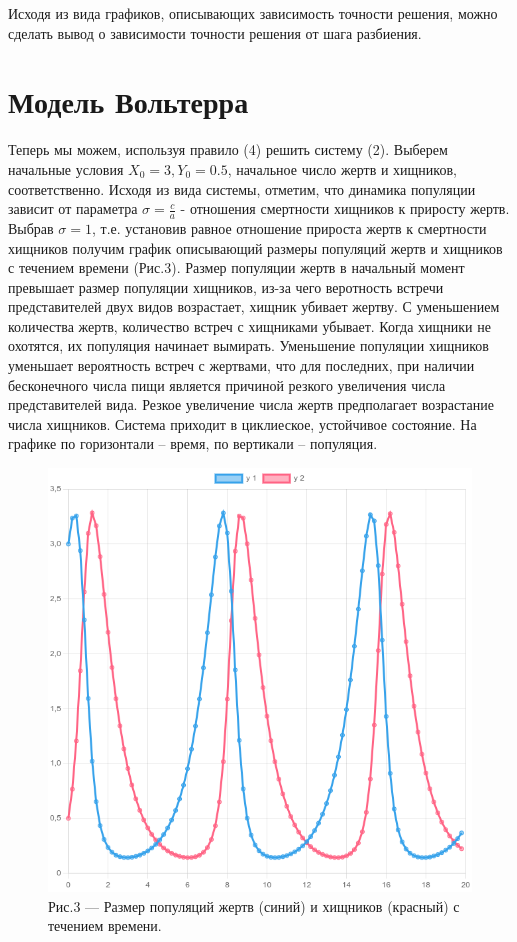 \documentclass[a4paper,12pt]{article}
\begin{document}
Исходя из вида графиков, описывающих зависимость точности решения, можно сделать вывод
о зависимости точности решения от шага разбиения. 

\newpage


\section{Модель Вольтерра}
\hspace{0.5cm} Теперь мы можем, используя правило (4) решить систему (2). Выберем начальные условия
$X_0 = 3, Y_0 = 0.5$, начальное число жертв и хищников, соответственно. Исходя из вида системы, отметим, что
динамика популяции зависит от параметра $\sigma = \frac{c}{a}$ - отношения смертности хищников к приросту жертв.
Выбрав $\sigma = 1$, т.е. установив равное отношение прироста жертв к смертности хищников получим график 
описывающий размеры популяций жертв и хищников с течением времени (Рис.3). Размер популяции жертв 
в начальный момент превышает размер популяции хищников, из-за чего веротность встречи представителей двух
видов возрастает, хищник убивает жертву. С уменьшением количества жертв, количество встреч 
с хищниками убывает. Когда хищники не охотятся, их популяция начинает вымирать. Уменьшение популяции хищников уменьшает
вероятность встреч с жертвами, что для последних, при наличии бесконечного числа пищи 
является причиной резкого увеличения числа представителей вида. Резкое
увеличение числа жертв предполагает возрастание числа хищников. Система приходит в циклиеское, устойчивое состояние. 
На графике по горизонтали -- время, по вертикали -- популяция.
\begin{figure}[h]
    \centering
    \includegraphics[width=0.5\linewidth]{pictures/task1.png}
    \captionsetup{labelformat=empty}
    \caption{Рис.3 --- Размер популяций жертв (синий) и хищников (красный) с течением времени.}
\end{figure}
\newpage
\end{document}
